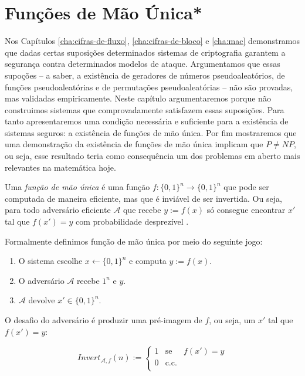\chapter{Funções de Mão Única*}
\label{cha:owf}

Nos Capítulos \ref{cha:cifras-de-fluxo}, \ref{cha:cifras-de-bloco} e \ref{cha:mac} demonstramos que dadas certas suposições determinados sistemas de criptografia garantem a segurança contra determinados modelos de ataque.
Argumentamos que essas supoções -- a saber, a existência de geradores de números pseudoaleatórios, de funções pseudoaleatórias e de permutações pseudoaleatórias -- não são provadas, mas validadas empiricamente.
Neste capítulo argumentaremos porque não construimos sistemas que comprovadamente satisfazem essas suposições.
Para tanto apresentaremos uma condição necessária e suficiente para a existência de sistemas seguros: a existência de funções de mão única.
Por fim mostraremos que uma demonstração da existência de funções de mão única implicam que $P \neq NP$, ou seja, esse resultado teria como consequência um dos problemas em aberto mais relevantes na matemática hoje.

Uma {\em função de mão única} é uma função $f: \{0,1\}^n \to \{0,1\}^n$ que pode ser computada de maneira eficiente, mas que é inviável de ser invertida.
Ou seja, para todo adversário eficiente $\mathcal{A}$ que recebe $y := f(x)$ só consegue encontrar $x'$ tal que $f(x') = y$ com probabilidade desprezível \cite{Diffie76,Yao82}.

Formalmente definimos função de mão única por meio do seguinte jogo:
\begin{enumerate}
\item O sistema escolhe $x \leftarrow \{0,1\}^n$ e computa $y := f(x)$.
\item O adversário $\mathcal{A}$ recebe $1^n$ e $y$.
\item $\mathcal{A}$ devolve $x' \in \{0,1\}^n$.
\end{enumerate}

O desafio do adversário é produzir uma pré-imagem de $f$, ou seja, um $x'$ tal que $f(x') = y$:

\begin{displaymath}
  Invert_{\mathcal{A}, f}(n) := \left\{
    \begin{array}{lcl}
      1 & \textrm{se} & f(x') = y\\
      0 & \textrm{c.c.} &\\
    \end{array}
    \right.
\end{displaymath}

